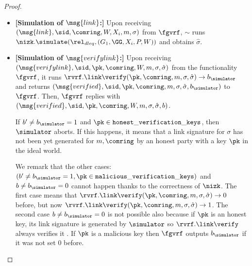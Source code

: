 \begin{proof}
\begin{itemize}
\begin{itemize}
		\end{itemize}
		
		
		
		
		
		\item \textbf{[Simulation of $ \msg{link} $:]} Upon receiving $(\msg{link}, \sid, \comring, W,X_i, m,  \sigma)$ from $\fgvrf$, $ \sim $ runs $ \nizk.\simulate(\rel_{dleq}, (G_1, \GG,X_i, P,W)) $ and obtains $ \hat{\sigma} $.
		
		
		
		\item \textbf{[Simulation of $ \msg{verifylink} $:]} Upon receiving  $(\msg{verifylink}, \sid, \pk, \comring, W,m, \sigma, \hat \sigma)$ from the functionality $\fgvrf$,  it runs $ \rvrf.\link\verify(\pk,\comring, m, \sigma,\hat \sigma) \rightarrow b_\simulator $ and  returns $ (\msg{verified}, \sid, \pk,\comring, m, \sigma, \hat\sigma, b_\simulator) $ to  $\fgvrf  $. Then, $ \fgvrf $ replies with $ (\msg{verified}, \sid, \pk,\comring,W, m, \sigma, \hat\sigma, b) $. 
		
		If $ b' \neq b_\simulator   = 1 $ and $ \pk \in \mathtt{honest\_verification\_keys} $, then $ \simulator $ aborts. If this happens, it means that a link signature for $ \sigma $ has not been yet generated for $ m, \comring $ by an honest party with a key $ \pk $ in the ideal world.
		
		We remark that the other cases:   $ (b' \neq b_\simulator   = 1, \pk \in \mathtt{malicious\_verification\_keys})$ and  $ b \neq b_\simulator = 0 $ cannot happen thanks to  the correctness of $ \nizk $. The first case  means that $ \rvrf.\link\verify(\pk,\comring, m, \sigma,\hat \sigma) \rightarrow 0$ before, but now $  \rvrf.\link\verify(\pk,\comring, m, \sigma,\hat \sigma) \rightarrow 1 $.  
		The second case $ b \neq b_\simulator = 0 $ is not possible also because if $ \pk $ is an honest key, its link signature is generated by $ \simulator $ so $ \rvrf.\link\verify $ always verifies it . If $ \pk $ is a malicious key then $ \fgvrf $ outputs  $ b_\simulator $ if it was not set 0 before. 
		

\end{itemize}
\end{proof}
